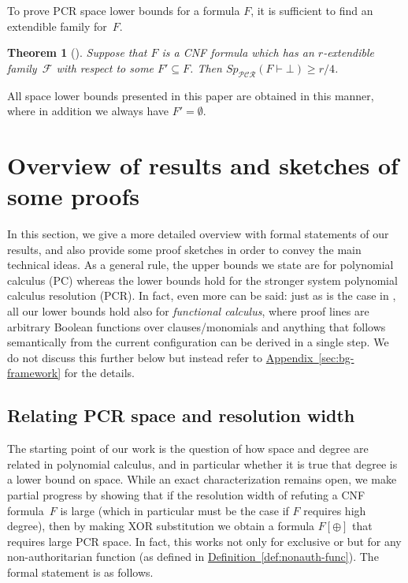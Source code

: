 \documentclass[11pt]{article}
\numberwithin{equation}{section}
\newtheorem{theorem}{Theorem}[section]
\theoremstyle{definition}
\theoremstyle{plain}
\newcommand{\expref}[2]{\hyperref[#2]{#1~\ref{#2}}}
\theoremstyle{plain}
\theoremstyle{definition}
\newcommand{\refdef}[1]{\expref{Definition}{#1}}
\newcommand{\refapp}[1]{\expref{Appendix}{#1}}
\newcommand{\introduceterm}[1]{{\emph{#1}}}
\newcommand{\proofsystemsubindexformat}[1]{\scriptscriptstyle{\mathcal{#1}}}
\newcommand{\pcrnot}{\proofsystemsubindexformat{PCR}}
\newcommand{\derivabbrevsmall}[2]{( #1 \vdash #2 )}
\newcommand{\refutabbrevsmall}[1]{\derivabbrevsmall{#1}{\!\bot}}
\newcommand{\genericrefsmall}[3]{{\mathit{#1}}_{#2}\refutabbrevsmall{#3}}
\newcommand{\mspaceref}[2][]{\genericrefsmall{Sp}{#1}{#2}}
\newcommand{\substform}[2]{{#1}[{#2}]}
\newcommand{\xor}{\oplus}
\newcommand{\kextendiblenot}{r}
\newcommand{\akextendible}{an \mbox{$\kextendiblenot$-ex}\-tend\-ible\xspace}
\newcommand{\kextendfamily}{\ensuremath{\mathcal{F}}\xspace}
\newcommand{\nonauthor}{non-author\-i\-tar\-ian\xspace}
\newcommand{\mysubsection}[1]{\subsection{#1}}
\begin{document}
To prove PCR space lower bounds for a formula $F$, it is sufficient to
find an extendible family for~$F$.

\begin{theorem}[\cite{BG15Framework}]
  \label{th:space-lower-bound}
Suppose that $F$ is a CNF formula which has \akextendible
  family~$\kextendfamily$
  with respect to some $F'\subseteq F$. Then
  $\mspaceref[\pcrnot]{F}\geq \kextendiblenot/4$.
\end{theorem}

All space lower bounds presented in this paper are obtained in this
  manner, where in addition we always have
  $F' = \emptyset$.
 
%
\section{Overview of results and sketches of some proofs}
\label{sec:overview-results}

In this section, we give
%
a more detailed overview with formal statements of our
results, and also provide some proof sketches in order to convey the
main technical ideas.
As a general rule, the upper bounds we state are for polynomial
  calculus (PC) whereas the lower bounds hold for the stronger system
  polynomial calculus resolution (PCR).
  In fact, even more can be said: just as is the case in
  \cite{ABRW02SpaceComplexity,FLNRT15SpaceCplx,BG15Framework},
  all our lower bounds
  hold also for
  \introduceterm{functional calculus},
  where proof lines are arbitrary Boolean functions over
  clauses/monomials and anything that follows semantically from the
  current configuration can be derived in a single step. We do not
  discuss this further below but instead refer to
 \refapp{sec:bg-framework}
  for the details.


\mysubsection{Relating PCR space and resolution width}
\label{sec:width-monomialspace}

The starting point of our work is the question of how space and degree
are related in polynomial calculus, and in particular whether it is
true that degree %
%
%
is a lower bound on space.  %
%
%
While an exact characterization remains
open, we make partial progress by showing that if the resolution width
of refuting a CNF formula~$F$ is large (which in particular must be
the case if $F$ requires high degree), then by making XOR
substitution we obtain a formula
$\substform{F}{\xor}$
that requires
large PCR space.
In fact, this works not only for exclusive or but for any
\nonauthor function
(as defined in \refdef{def:nonauth-func}).
The formal statement
%
is as follows.
\end{document}
